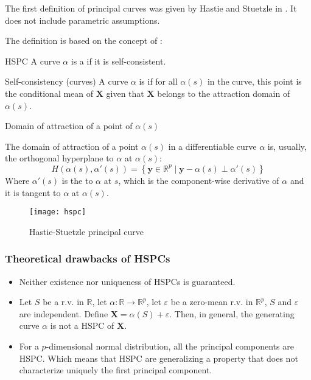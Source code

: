 The first definition of principal curves was given by Hastie and Stuetzle in \cite{hastie_principal_1989}.
It does not include parametric assumptions.

The definition is based on the concept of :
\begin{definition}{HSPC}{}
	A curve $\alpha$ is a  if it is self-consistent.
\end{definition}

\begin{definition}{Self-consistency (curves)}{}
	A curve $\alpha$ is  if for all $\alpha(s)$ in the curve,
	this point is the conditional mean of $\boldsymbol X$ given that $\boldsymbol X$ belongs
	to the attraction domain of $\alpha(s)$.
\end{definition}

\begin{definition}{Domain of attraction of a point of $\alpha(s)$}{}

	The domain of attraction of a point $\alpha(s)$ in a differentiable curve $\alpha$
	is, usually, the orthogonal hyperplane to $\alpha$ at $\alpha(s)$:
	\begin{equation*}
		H(\alpha(s), \alpha'(s)) = \left\{
		\boldsymbol{y} \in \mathds{R}^p \mid \boldsymbol{y} - \alpha(s) \perp \alpha'(s)
		\right\}
	\end{equation*}
	Where $\alpha'(s)$ is the  to $\alpha$ at $s$, which is
	the component-wise derivative of $\alpha$ and it is tangent to $\alpha$ at $\alpha(s)$.
\end{definition}

\begin{figure}[H]
	\texttt{[image: hspc]}
	\caption{Hastie-Stuetzle principal curve}
\end{figure}

\subsubsection{Theoretical drawbacks of HSPCs}

\begin{itemize}
	\item Neither existence nor uniqueness of HSPCs is guaranteed.
	\item Let $S$ be a r.v. in $\mathds{R}$, let $\alpha: \mathds{R} \to \mathds{R}^p$, let $\varepsilon$
	      be a zero-mean r.v. in $\mathds{R}^p$, $S$ and $\varepsilon$ are independent. Define
	      $\boldsymbol{X} = \alpha(S) + \varepsilon$. Then, in general, the
	      generating curve $\alpha$ is not a HSPC of $\boldsymbol{X}$.
	\item For a $p$-dimensional normal distribution, all the principal components are HSPC. Which
	      means that HSPC are generalizing a property that does not characterize uniquely the first
	      principal component.
\end{itemize}

